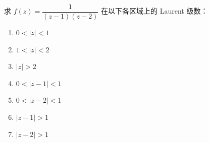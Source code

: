 \documentclass[openany,oneside]{ctexbook}
\begin{document}
\begin{example}
求 \( f(z)=\dfrac{1}{(z-1)(z-2)} \) 在以下各区域上的 Laurent 级数：

\begin{enumerate}
    \item \( 0<|z|<1 \)
    \item \( 1<|z|<2 \)
    \item \( |z|>2 \)
    \item \( 0<|z-1|<1 \)
    
\end{enumerate}

\begin{enumerate}
  \setcounter{enumi}{4}
  \item \( 0<|z-2|<1 \)
    \item \( |z-1|>1 \)
    \item \( |z-2|>1 \)
\end{enumerate}

\end{example}
\end{document}
